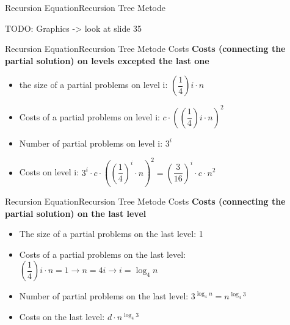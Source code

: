 
\begin{frame}{Recursion Equation}{Recursion Tree Metode}
	
	TODO: Graphics -> look at slide 35 \vspace{2em}
	
\end{frame}


\begin{frame}{Recursion Equation}{Recursion Tree Metode Costs}
	\textbf{Costs (connecting the partial solution) on levels excepted the last 
	one}
	\begin{itemize}
		\item
			the size of a partial problems on level i: $\left(\dfrac{1}{4}\right)i 
			\cdot n$
		\item
			Costs of a partial problems on level i: $c \cdot 
			\left(\left(\dfrac{1}{4}\right)i \cdot n\right)^2$
		\item
			Number of partial problems on level i: $3^{i}$
		\item
			Costs on level i: $3^{i} \cdot c \cdot 
			\left(\left(\dfrac{1}{4}\right)^{i} \cdot n 
			\right)^2 = \left(\dfrac{3}{16}\right)^{i} \cdot c \cdot n^2$
	\end{itemize}
\end{frame}


\begin{frame}{Recursion Equation}{Recursion Tree Metode Costs}
	\textbf{Costs (connecting the partial solution) on the last level}
	\begin{itemize}
		\item
			The size of a partial problems on the last level: 1
		\item
			Costs of a partial problems on the last level: 
			$\left(\dfrac{1}{4}\right)i \cdot n = 1 \rightarrow n = 4i \rightarrow i 
			= \log_4 n$
		\item
			Number of partial problems on the last level: $3^{\log_4 n} = n^{\log_4 
			3}$
		\item
			Costs on the last level: $d \cdot n^{\log_4 3}$
	\end{itemize}
\end{frame}

